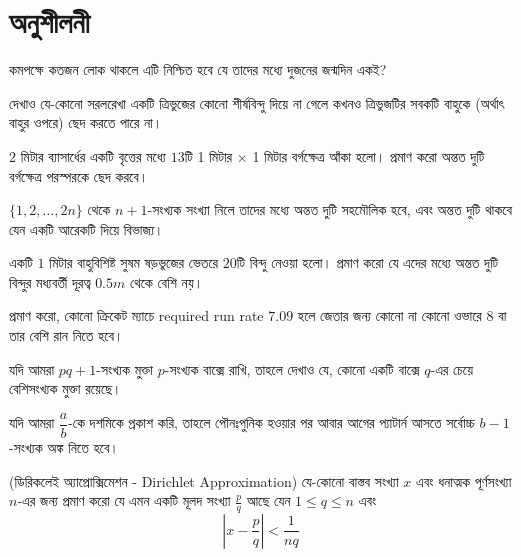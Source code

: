 \section{অনুশীলনী}
\begin{exercise}
কমপক্ষে কতজন লোক থাকলে এটি নিশ্চিত হবে যে তাদের মধ্যে দুজনের জন্মদিন একই?
\end{exercise}

\begin{exercise}
দেখাও যে-কোনো সরলরেখা একটি ত্রিভুজের কোনো শীর্ষবিন্দু দিয়ে না গেলে কখনও ত্রিভুজটির সবকটি বাহুকে (অর্থাৎ বাহুর ওপরে) ছেদ করতে পারে না।
\end{exercise}

\begin{exercise}
$2$ মিটার ব্যাসার্ধের একটি বৃত্তের মধ্যে $13$টি 1 মিটার $\times$ 1 মিটার বর্গক্ষেত্র আঁকা হলো। প্রমাণ করো অন্তত দুটি বর্গক্ষেত্র পরস্পরকে ছেদ করবে।
\end{exercise}

\begin{exercise}
$\{1,2,\dots,2n\}$ থেকে $n+1$-সংখ্যক সংখ্যা নিলে তাদের মধ্যে অন্তত দুটি সহমৌলিক হবে, এবং অন্তত দুটি থাকবে যেন একটি আরেকটি দিয়ে বিভাজ্য।
\end{exercise}

\begin{exercise}
একটি $1$ মিটার বাহুবিশিষ্ট সুষম ষড়ভুজের ভেতরে $20$টি বিন্দু নেওয়া হলো। প্রমাণ করো যে এদের মধ্যে অন্তত দুটি বিন্দুর মধ্যবর্তী দূরত্ব $0.5m$ থেকে বেশি নয়।
\end{exercise}

\begin{exercise}
প্রমাণ করো, কোনো ক্রিকেট ম্যাচে required run rate $7.09$ হলে জেতার জন্য কোনো না কোনো ওভারে $8$ বা তার বেশি রান নিতে হবে।
\end{exercise}

\begin{exercise}
যদি আমরা $pq+1$-সংখ্যক মুক্তা $p$-সংখ্যক বাক্সে রাখি, তাহলে দেখাও যে, কোনো একটি বাক্সে $q$-এর চেয়ে বেশিসংখ্যক মুক্তা রয়েছে।
\end{exercise}

\begin{exercise}
যদি আমরা $\dfrac{a}{b}$-কে দশমিকে প্রকাশ করি, তাহলে পৌনঃপুনিক হওয়ার পর আবার আগের প্যাটার্ন আসতে সর্বোচ্চ $b-1$-সংখ্যক অঙ্ক নিতে হবে।
\end{exercise}

\begin{exercise}
(ডিরিকলেই অ্যাপ্রোক্সিমেশন - Dirichlet Approximation) যে-কোনো বাস্তব সংখ্যা $x$ এবং ধনাত্মক পূর্ণসংখ্যা $n$-এর জন্য প্রমাণ করো যে এমন একটি মূলদ সংখ্যা $\frac p q$ আছে যেন $1\leq q\leq n$ এবং
	\[\left|x-\frac p q\right| < \frac 1 {nq}\]
\end{exercise}

